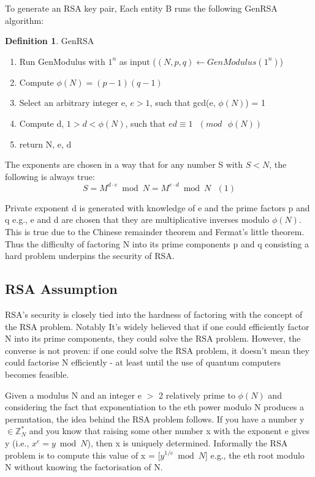\documentclass[]{final_report}
\theoremstyle{definition}
\newtheorem{definition}{Definition}[chapter]
\begin{document}
To generate an RSA key pair, Each entity B runs the following GenRSA algorithm:

\begin{definition} GenRSA 
\begin{enumerate}
    \item Run GenModulus with $1^n$ as input ($(N, p, q) \leftarrow GenModulus(1^n)$)
    \item Compute $\phi(N) = (p - 1)(q - 1)$
    \item Select an arbitrary integer e, $e > 1$, such that gcd(e, $\phi(N)$) = 1 
    \item Compute d, $1 > d < \phi(N)$, such that $ed \equiv 1 \text{ } (mod \text{ } \phi(N))$
    \item return N, e, d
\end{enumerate}
\end{definition}

The exponents are chosen in a way that for any number S with $S < N$, the following is always true:
\[S = M^{d \cdot e} \bmod N = M^{e \cdot d} \bmod N \text{ } (1)\]

Private exponent d is generated with knowledge of e and the prime factors p and q e.g., e and d are chosen that they are multiplicative inverses modulo $\phi(N)$. This is true due to the Chinese remainder theorem and Fermat’s little theorem. Thus the difficulty of factoring N into its prime components p and q consisting a hard problem underpins the security of RSA. 

\subsection{RSA Assumption}
RSA's security is closely tied into the hardness of factoring with the concept of the RSA problem. Notably It's widely believed that if one could efficiently factor N into its prime components, they could solve the RSA problem. However, the converse is not proven: if one could solve the RSA problem, it doesn't mean they could factorise N efficiently - at least until the use of quantum computers becomes feasible.

Given a modulus N and an integer e $>$ 2 relatively prime to $\phi(N)$ and considering the fact that exponentiation to the eth power modulo N produces a permutation, the idea behind the RSA problem follows. If you have a number y $\in \mathbb{Z}^*_{N}$ and you know that raising some other number x with the exponent e gives y (i.e., $x^e = y \bmod N$), then x is uniquely determined. Informally the RSA problem is to compute this value of x =  [$y^{1/e} \bmod N$] e.g., the eth root modulo N without knowing the factorisation of N.
\end{document}

